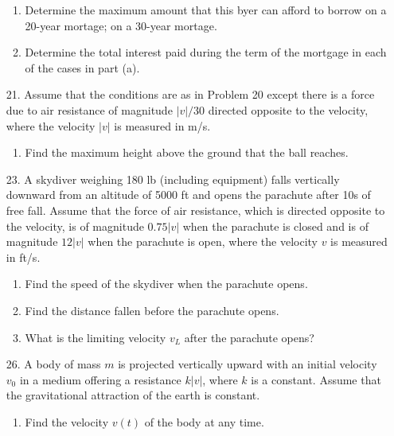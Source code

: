 \documentclass[9pt]{article}
\begin{document}
\begin{enumerate}
               \begin{enumerate}
                  \item Determine the maximum amount that this byer can afford
                        to borrow on a 20-year mortage; on a 30-year mortage.
                  \item Determine the total interest paid during the term of the
                        mortgage in each of the cases in part (a).
               \end{enumerate}
   \item[21.]  Assume that the conditions are as in Problem 20 except there is a
               force due to air resistance of magnitude $|v|/30$ directed
               opposite to the velocity, where the velocity $|v|$ is measured in
               m/s.

               \begin{enumerate}
                  \item Find the maximum height above the ground that the ball
                        reaches.
               \end{enumerate}
   \item[23.]  A skydiver weighing 180 lb (including equipment) falls vertically
               downward from an altitude of 5000 ft and opens the parachute
               after 10s of free fall. Assume that the force of air resistance,
               which is directed opposite to the velocity, is of magnitude
               $0.75|v|$ when the parachute is closed and is of magnitude
               $12|v|$ when the parachute is open, where the velocity $v$ is
               measured in ft/s.

               \begin{enumerate}
                  \item Find the speed of the skydiver when the parachute opens.
                  \item Find the distance fallen before the parachute opens.
                  \item What is the limiting velocity $v_L$ after the parachute
                        opens?
               \end{enumerate}
   \item[26.]  A body of mass $m$ is projected vertically upward with an initial
               velocity $v_0$ in a medium offering a resistance $k|v|$, where
               $k$ is a constant. Assume that the gravitational attraction of
               the earth is constant.

               \begin{enumerate}
                  \item Find the velocity $v(t)$ of the body at any time.
               \end{enumerate}
      
\end{enumerate}
\end{document}
